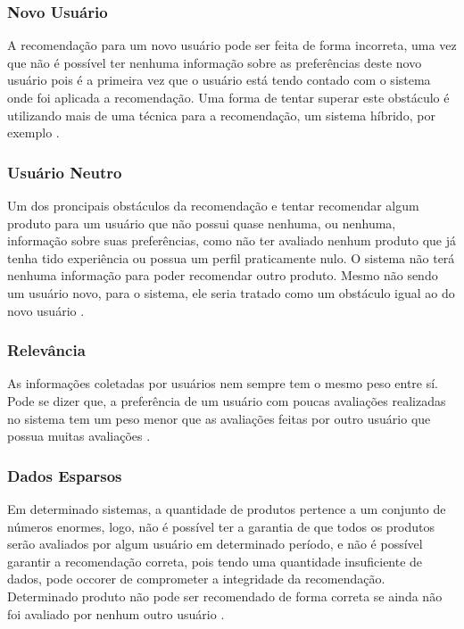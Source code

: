 \documentclass[12pt,
				openright,
				twoside,
				a4paper,
				apter=TITLE,
				section=TITLE,
				subsection=TITLE,
				chapter=TITLE,
				english,
				brazil]{abntex2}
\begin{document}
\subsubsection{Novo Usuário}
A recomendação para um novo usuário pode ser feita de forma incorreta, uma vez que não é possível ter nenhuma informação sobre as preferências deste novo usuário pois é a primeira vez que o usuário está tendo contado com o sistema onde foi aplicada a recomendação. Uma forma de tentar superar este obstáculo é utilizando mais de uma técnica para a recomendação, um sistema híbrido, por exemplo \cite{sun2010new}.

\subsubsection{Usuário Neutro}
Um dos proncipais obstáculos da recomendação e tentar recomendar algum produto para um usuário que não possui quase nenhuma, ou nenhuma, informação sobre suas preferências, como não ter avaliado nenhum produto que já tenha tido experiência ou possua um perfil praticamente nulo. O sistema não terá nenhuma informação para poder recomendar outro produto. Mesmo não sendo um usuário novo, para o sistema, ele seria tratado como um obstáculo igual ao do novo usuário \cite{asanov2011algorithms}.

\subsubsection{Relevância}
As informações coletadas por usuários nem sempre tem o mesmo peso entre sí. Pode se dizer que, a preferência de um usuário com poucas avaliações realizadas no sistema tem um peso menor que as avaliações feitas por outro usuário que possua muitas avaliações \cite{asanov2011algorithms}.

\subsubsection{Dados Esparsos}
Em determinado sistemas, a quantidade de produtos pertence a um conjunto de números enormes, logo, não é possível ter a garantia de que todos os produtos serão avaliados por algum usuário em determinado período, e não é possível garantir a recomendação correta, pois tendo uma quantidade insuficiente de dados, pode occorer de comprometer a integridade da recomendação. Determinado produto não pode ser recomendado de forma correta se ainda não foi avaliado por nenhum outro usuário \cite{chen2011solving}.
\end{document}
